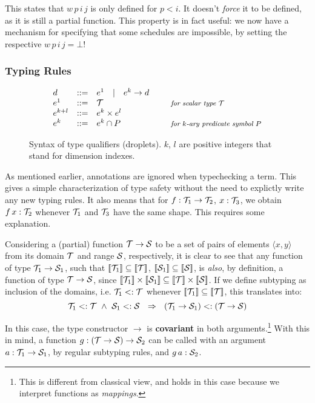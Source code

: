 This states that $w\,p\,i\,j$ is only defined for $p<i$. It doesn't {\em force} it to be defined,
as it is still a partial function. This property is in fact useful: we now have a mechanism for
specifying that some schedules are impossible, by setting the respective $w\,p\,i\,j=\bot$!

\subsubsection*{Typing Rules}

\begin{figure}
\[
\begin{array}{lcll}
  d       & ::= & e^1 \quad |\quad e^k\to d \\
  e^1     & ::= & \T & \mbox{\it\small for scalar type $\T$} \\
  e^{k+l} & ::= & e^k \times e^l \\
  e^k     & ::= & e^k \cap P & \mbox{\it\small for $k$-ary predicate symbol $P$} 
\end{array}
\]
\vspace{-.5em}
\caption{\label{lang:droplets}
  Syntax of type qualifiers (droplets). $k$, $l$ are positive integers
  that stand for dimension indexes.}
\end{figure}

As mentioned earlier, annotations are ignored when typechecking a term.
This gives a simple characterization of type safety without the need to
explictly write any new typing rules. It also means that for $f:\T_1\to\T_2$, $x:\T_3$, we obtain $f\,x:\T_2$ whenever
$\T_1$ and $\T_3$ have the same shape. This requires some explanation.

Considering a (partial) function $\T\to\S$ to be a set of pairs of elements $\langle x,y\rangle$ 
from its domain $\T$ and range $\S$, respectively, it is clear to see that any function of type $\T_1\to\S_1$,
such that $\semp{\T_1}\subseteq\semp{\T}$, $\semp{\S_1}\subseteq\semp{\S}$, 
is \emph{also}, by definition, a function of type $\T\to\S$, since $\semp{\T_1}\times\semp{\S_1}\subseteq\semp{\T}\times\semp{\S}$.
If we define subtyping as inclusion of the domains, i.e. $\T_1 <:\T$ whenever $\semp{\T_1}\subseteq\semp{\T}$,
this translates into:
%
\[\T_1<:\T ~\land~ \S_1<:\S ~~\Rightarrow~~ (\T_1\to\S_1) <: (\T\to\S)\]

In this case, the type constructor $\to$ is {\bf covariant} in both arguments.\footnote{This is different from classical view, and holds in this case because we interpret functions as \emph{mappings}.}
With this in mind, a function $g:(\T\to\S)\to \S_2$ can be called with an argument $a: \T_1\to\S_1$,
by regular subtyping rules, and $g\,a : \S_2$.

